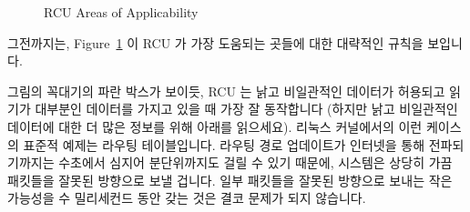 \begin{figure}[tbh]
\begin{center}
\end{center}
\caption{RCU Areas of Applicability}
\label{fig:defer:RCU Areas of Applicability}
\end{figure}

그전까지는,
Figure~\ref{fig:defer:RCU Areas of Applicability}
이 RCU 가 가장 도움되는 곳들에 대한 대략적인 규칙을 보입니다.

그림의 꼭대기의 파란 박스가 보이듯, RCU 는 낡고 비일관적인 데이터가 허용되고
읽기가 대부분인 데이터를 가지고 있을 때 가장 잘 동작합니다 (하지만 낡고
비일관적인 데이터에 대한 더 많은 정보를 위해 아래를 읽으세요).
리눅스 커널에서의 이런 케이스의 표준적 예제는 라우팅 테이블입니다.
라우팅 경로 업데이트가 인터넷을 통해 전파되기까지는 수초에서 심지어
분단위까지도 걸릴 수 있기 때문에, 시스템은 상당히 가끔 패킷들을 잘못된 방향으로
보낼 겁니다.
일부 패킷들을 잘못된 방향으로 보내는 작은 가능성을 수 밀리세컨드 동안 갖는 것은
결코 문제가 되지 않습니다.

